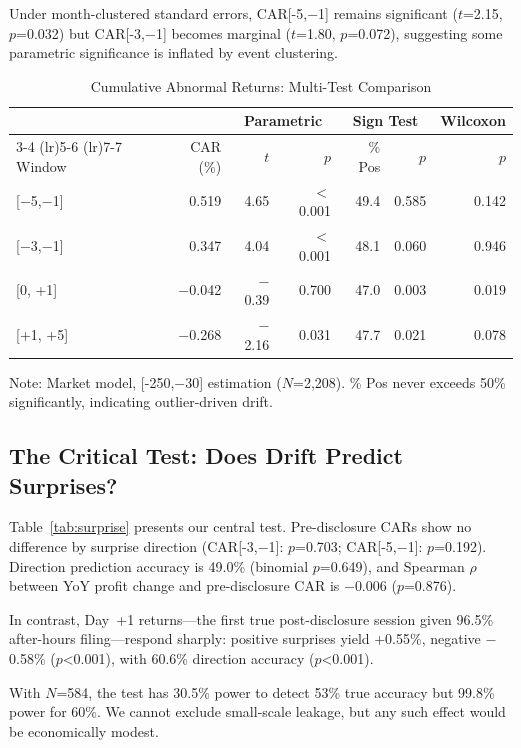 \documentclass[manuscript,review,anonymous]{acmart}
\begin{document}
Under month-clustered standard errors, CAR[-5,$-$1] remains significant ($t$=2.15, $p$=0.032) but CAR[-3,$-$1] becomes marginal ($t$=1.80, $p$=0.072), suggesting some parametric significance is inflated by event clustering.

\begin{table}[h]
\caption{Cumulative Abnormal Returns: Multi-Test Comparison}
\label{tab:car}
\begin{tabular}{lrrrrrr}
\toprule
& & \multicolumn{2}{c}{Parametric} & \multicolumn{2}{c}{Sign Test} & {Wilcoxon} \\
\cmidrule(lr){3-4} \cmidrule(lr){5-6} \cmidrule(lr){7-7}
Window & CAR (\%) & $t$ & $p$ & \% Pos & $p$ & $p$ \\
\midrule
{[}$-$5,$-$1{]} & 0.519 & 4.65 & $<$0.001 & 49.4 & 0.585 & 0.142 \\
{[}$-$3,$-$1{]} & 0.347 & 4.04 & $<$0.001 & 48.1 & 0.060 & 0.946 \\
{[}0, +1{]} & $-$0.042 & $-$0.39 & 0.700 & 47.0 & 0.003 & 0.019 \\
{[}+1, +5{]} & $-$0.268 & $-$2.16 & 0.031 & 47.7 & 0.021 & 0.078 \\
\bottomrule
\end{tabular}
\begin{flushleft}
\small Note: Market model, [-250,$-$30] estimation ($N$=2,208). \% Pos never exceeds 50\% significantly, indicating outlier-driven drift.
\end{flushleft}
\end{table}

\subsection{The Critical Test: Does Drift Predict Surprises?}

Table~\ref{tab:surprise} presents our central test. Pre-disclosure CARs show no difference by surprise direction (CAR[-3,$-$1]: $p$=0.703; CAR[-5,$-$1]: $p$=0.192). Direction prediction accuracy is 49.0\% (binomial $p$=0.649), and Spearman $\rho$ between YoY profit change and pre-disclosure CAR is $-$0.006 ($p$=0.876).

In contrast, Day~+1 returns---the first true post-disclosure session given 96.5\% after-hours filing---respond sharply: positive surprises yield +0.55\%, negative $-$0.58\% ($p$<0.001), with 60.6\% direction accuracy ($p$<0.001).

With $N$=584, the test has 30.5\% power to detect 53\% true accuracy but 99.8\% power for 60\%. We cannot exclude small-scale leakage, but any such effect would be economically modest.
\end{document}
